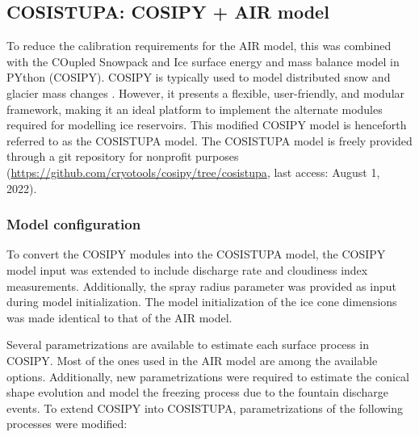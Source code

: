 \subsection{COSISTUPA: COSIPY + AIR model}
\label{sec:Cosistupa}

To reduce the calibration requirements for the \ac{AIR} model, this was combined with the COupled Snowpack and
Ice surface energy and mass balance model in PYthon (COSIPY). COSIPY is typically used to model distributed snow
and glacier mass changes \citep{sauterCOSIPYV1Opensource2020}. However, it presents a flexible, user-friendly,
and modular framework, making it an ideal platform to implement the alternate modules required for modelling ice
reservoirs. This modified COSIPY model is henceforth referred to as the COSISTUPA model. The COSISTUPA model is
freely provided through a git repository for nonprofit purposes
(\url{https://github.com/cryotools/cosipy/tree/cosistupa}, last access: August 1, 2022). 


\subsubsection{Model configuration}

To convert the COSIPY modules into the COSISTUPA model, the COSIPY model input was extended to include discharge rate and cloudiness index measurements. Additionally, the spray radius parameter was provided as input during model initialization. The model initialization of the ice
cone dimensions was made identical to that of the \ac{AIR} model.

Several parametrizations are available to estimate each surface process in COSIPY. Most of the ones
used in the \ac{AIR} model are among the available options. Additionally, new parametrizations were required to
estimate the conical shape evolution and model the freezing process due to the fountain discharge events. To
extend COSIPY into COSISTUPA, parametrizations of the following processes were modified:

